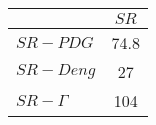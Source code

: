 \begin{tabular}{l|c}
\toprule
{} &  $SR$ \\
\midrule
\textbf{$SR-PDG$   } &  74.8 \\
\textbf{$SR-Deng$  } &    27 \\
\textbf{$SR-\Gamma$} &   104 \\
\bottomrule
\end{tabular}
